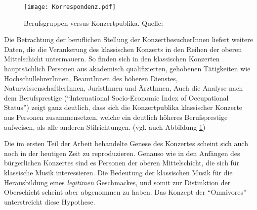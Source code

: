 \documentclass[a4paper, german, oneside]{scrbook}
\begin{document}
\begin{figure}[ht]
	\centering
  		\texttt{[image: Korrespondenz.pdf]}
	\caption{Berufsgruppen versus Konzertpublika. Quelle: \cite[487]{de_la_motte-haber_konzertpublika_2007}\protect\footnotemark } %
	\label{korrespondenzgrafik}
\end{figure}



Die Betrachtung der beruflichen Stellung der KonzertbesucherInnen liefert weitere Daten, die die Verankerung des klassischen Konzerts in den Reihen der oberen Mittelschicht untermauern. So finden sich in den klassischen Konzerten hauptsächlich Personen aus akademisch qualifizierten, gehobenen Tätigkeiten wie HochschullehrerInnen, BeamtInnen des höheren Dienstes, NaturwissenschaftlerInnen, JuristInnen und ÄrztInnen,  Auch die Analyse nach dem Berufsprestige (\enquote{International Socio-Economic Index of Occupational Status}) zeigt ganz deutlich, dass sich die Konzertpublika klassischer Konzerte aus Personen zusammensetzen, welche ein deutlich höheres Berufsprestige aufweisen, als alle anderen Stilrichtungen. (vgl. auch Abbildung \ref{korrespondenzgrafik})



Die im ersten Teil der Arbeit behandelte Genese des Konzertes scheint sich auch noch in der heutigen Zeit zu reproduzieren. Genauso wie in den Anfängen des bürgerlichen Konzertes sind es Personen der oberen Mittelschicht, die sich für klassische Musik interessieren. Die Bedeutung der klassischen Musik für die Herausbildung eines \emph{legitimen} Geschmackes, und somit zur Distinktion der Oberschicht scheint aber abgenommen zu haben. Das Konzept der \enquote{Omnivores} unterstreicht diese Hypothese.
\end{document}
